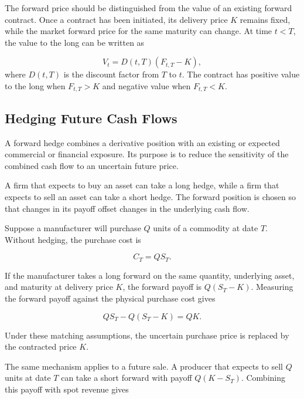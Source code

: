 The forward price should be distinguished from the value of an existing forward contract. Once a contract has been initiated, its delivery price $K$ remains fixed, while the market forward price for the same maturity can change. At time $t<T$, the value to the long can be written as

\begin{equation}
V_t=D(t,T)\left(F_{t,T}-K\right),
\label{eq:ch17-forward-value-general}
\end{equation}
where $D(t,T)$ is the discount factor from $T$ to $t$. The contract has positive value to the long when $F_{t,T}>K$ and negative value when $F_{t,T}<K$.

\subsection{Hedging Future Cash Flows}

A forward hedge combines a derivative position with an existing or expected commercial or financial exposure. Its purpose is to reduce the sensitivity of the combined cash flow to an uncertain future price.

A firm that expects to buy an asset can take a long hedge, while a firm that expects to sell an asset can take a short hedge. The forward position is chosen so that changes in its payoff offset changes in the underlying cash flow.

Suppose a manufacturer will purchase $Q$ units of a commodity at date $T$. Without hedging, the purchase cost is

\begin{equation*}
C_T=QS_T.
\label{eq:ch17-unhedged-purchase-cost}
\end{equation*}

If the manufacturer takes a long forward on the same quantity, underlying asset, and maturity at delivery price $K$, the forward payoff is $Q(S_T-K)$. Measuring the forward payoff against the physical purchase cost gives

\begin{equation*}
QS_T-Q(S_T-K)=QK.
\label{eq:ch17-perfect-long-forward-hedge}
\end{equation*}

Under these matching assumptions, the uncertain purchase price is replaced by the contracted price $K$.

The same mechanism applies to a future sale. A producer that expects to sell $Q$ units at date $T$ can take a short forward with payoff $Q(K-S_T)$. Combining this payoff with spot revenue gives

